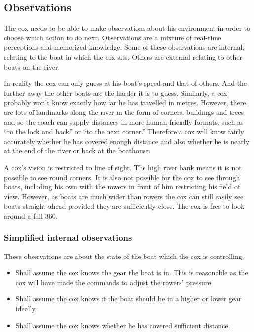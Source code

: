       \subsection{Observations} \label{model:cox:obs}
      The cox needs to be able to make observations about his environment in order to choose which action to do next. Observations are a mixture of real-time perceptions and memorized knowledge. Some of these observations are internal, relating to the boat in which the cox sits. Others are external relating to other boats on the river. 
      
      In reality the cox can only guess at his boat's speed and that of others. And the further away the other boats are the harder it is to guess. Similarly, a cox probably won't know exactly how far he has travelled in metres. However, there are lots of landmarks along the river in the form of corners, buildings and trees and so the coach can supply distances in more human-friendly formats, such as ``to the lock and back'' or ``to the next corner.'' Therefore a cox will know fairly accurately whether he has covered enough distance and also whether he is nearly at the end of the river or back at the boathouse.
      
      A cox's vision is restricted to line of sight. The high river bank means it is not possible to see round corners. It is also not possible for the cox to see through boats, including his own with the rowers in front of him restricting his field of view. However, as boats are much wider than rowers the cox can still easily see boats straight ahead provided they are sufficiently close. The cox is free to look around a full 360\textdegree.
      
      \subsubsection{Simplified internal observations}
      These observations are about the state of the boat which the cox is controlling.
      \begin{itemize}
        \item Shall assume the cox knows the gear the boat is in. This is reasonable as the cox will have made the commands to adjust the rowers' pressure.
        \item Shall assume the cox knows if the boat should be in a higher or lower gear ideally.
        \item Shall assume the cox knows whether he has covered sufficient distance.
      \end{itemize}
      

